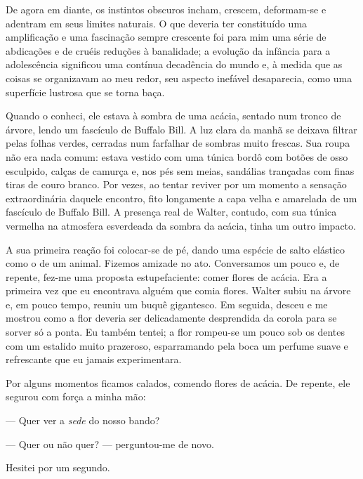 De agora em diante, os instintos obscuros incham, crescem, deformam-se e
adentram em seus limites naturais. O que deveria ter constituído uma
amplificação e uma fascinação sempre crescente foi para mim uma série de
abdicações e de cruéis reduções à banalidade; a evolução da infância para a
adolescência significou uma contínua decadência do mundo e, à medida que as
coisas se organizavam ao meu redor, seu aspecto inefável desaparecia, como
uma superfície lustrosa que se torna baça.


Quando o conheci, ele estava à sombra de uma acácia, sentado num tronco de
árvore, lendo um fascículo de Buffalo Bill.  A luz clara da manhã se deixava
filtrar pelas folhas verdes, cerradas num farfalhar de sombras muito frescas.
Sua roupa não era nada comum: estava vestido com uma túnica bordô com botões
de osso esculpido, calças de camurça e, nos pés sem meias, sandálias
trançadas com finas tiras de couro branco. Por vezes, ao tentar reviver por
um momento a sensação extraordinária daquele encontro, fito longamente a capa
velha e amarelada de um fascículo de Buffalo Bill. A presença real de Walter,
contudo, com sua túnica vermelha na atmosfera esverdeada da sombra da acácia,
tinha um outro impacto.

A sua primeira reação foi colocar-se de pé, dando uma espécie de salto
elástico como o de um animal. Fizemos amizade no ato. Conversamos um pouco e,
de repente, fez-me uma proposta estupefaciente: comer flores de acácia. Era a
primeira vez que eu encontrava alguém que comia flores. Walter subiu na
árvore e, em pouco tempo, reuniu um buquê gigantesco. Em seguida, desceu e me
mostrou como a flor deveria ser delicadamente desprendida da corola para se
sorver só a ponta. Eu também tentei; a flor rompeu-se um pouco sob os dentes
com um estalido muito prazeroso, esparramando pela boca um perfume suave e
refrescante que eu jamais experimentara.

Por alguns momentos ficamos calados, comendo flores de acácia. De repente, ele
segurou com força a minha mão: 

--- Quer ver a \textit{sede} do nosso bando?


--- Quer ou não quer? --- perguntou-me de novo. 

Hesitei por um segundo. 

